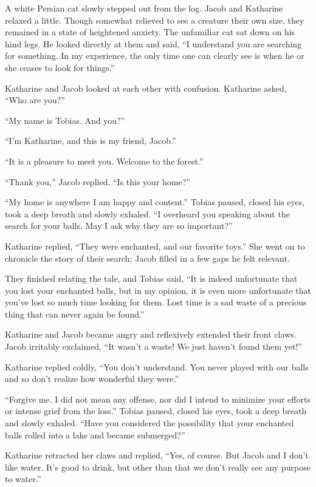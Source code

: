 A white Persian cat slowly stepped out from the log. Jacob and Katharine relaxed a little. Though somewhat relieved to see a creature their own size, they remained in a state of heightened anxiety. The unfamiliar cat sat down on his hind legs. He looked directly at them and said, “I understand you are searching for something. In my experience, the only time one can clearly see is when he or she ceases to look for things.”

Katharine and Jacob looked at each other with confusion. Katharine asked, “Who are you?”

“My name is Tobias. And you?”

“I'm Katharine, and this is my friend, Jacob.”

“It is a pleasure to meet you. Welcome to the forest.”

“Thank you,” Jacob replied. “Is this your home?”

“My home is anywhere I am happy and content.” Tobias paused, closed his eyes, took a deep breath and slowly exhaled. “I overheard you speaking about the search for your balls. May I ask why they are so important?”

Katharine replied, “They were enchanted, and our favorite toys.” She went on to chronicle the story of their search; Jacob filled in a few gaps he felt relevant.

They finished relating the tale, and Tobias said, “It is indeed unfortunate that you lost your enchanted balls, but in my opinion, it is even more unfortunate that you've lost so much time looking for them. Lost time is a sad waste of a precious thing that can never again be found.”

Katharine and Jacob became angry and reflexively extended their front claws. Jacob irritably exclaimed, “It wasn't a waste! We just haven't found them yet!”

Katharine replied coldly, “You don't understand. You never played with our balls and so don't realize how wonderful they were.”

“Forgive me. I did not mean any offense, nor did I intend to minimize your efforts or intense grief from the loss.” Tobias paused, closed his eyes, took a deep breath and slowly exhaled. “Have you considered the possibility that your enchanted balls rolled into a lake and became submerged?”

Katharine retracted her claws and replied, “Yes, of course. But Jacob and I don't like water. It's good to drink, but other than that we don't really see any purpose to water.”

